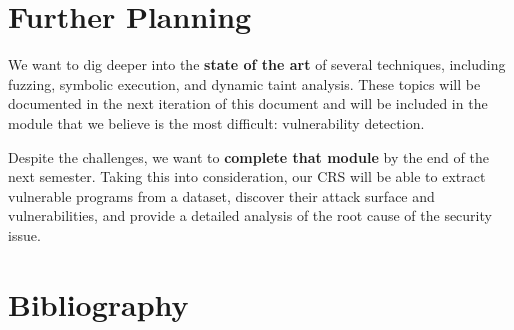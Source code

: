 \documentclass[12pt,a4paper,english,onecolumn]{IEEEtran}
\begin{document}
\section{Further Planning}

We want to dig deeper into the \textbf{state of the art} of several techniques, including fuzzing, symbolic execution, and dynamic taint analysis. These topics will be documented in the next iteration of this document and will be included in the module that we believe is the most difficult: vulnerability detection.

Despite the challenges, we want to \textbf{complete that module} by the end of the next semester. Taking this into consideration, our CRS will be able to extract vulnerable programs from a dataset, discover their attack surface and vulnerabilities, and provide a detailed analysis of the root cause of the security issue.

\section{Bibliography}
\nocite{*}
\printbibliography[heading=none]
\end{document}
